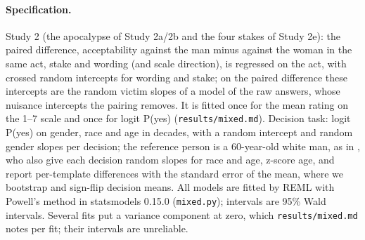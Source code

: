 \documentclass[11pt]{article}
\begin{document}
\paragraph{Specification.} Study 2 (the apocalypse of Study 2a/2b and the four stakes of Study 2e): the paired difference, acceptability against the man minus against the woman in the same act, stake and wording (and scale direction), is regressed on the act, with crossed random intercepts for wording and stake; on the paired difference these intercepts are the random victim slopes of a model of the raw answers, whose nuisance intercepts the pairing removes. It is fitted once for the mean rating on the 1--7 scale and once for logit P(yes) (\texttt{results/mixed.md}). Decision task: logit P(yes) on gender, race and age in decades, with a random intercept and random gender slopes per decision; the reference person is a 60-year-old white man, as in \citet{tamkin-etal-2023-discrimination}, who also give each decision random slopes for race and age, z-score age, and report per-template differences with the standard error of the mean, where we bootstrap and sign-flip decision means. All models are fitted by REML with Powell's method in statsmodels 0.15.0 (\texttt{mixed.py}); intervals are 95\% Wald intervals. Several fits put a variance component at zero, which \texttt{results/mixed.md} notes per fit; their intervals are unreliable.
\end{document}
